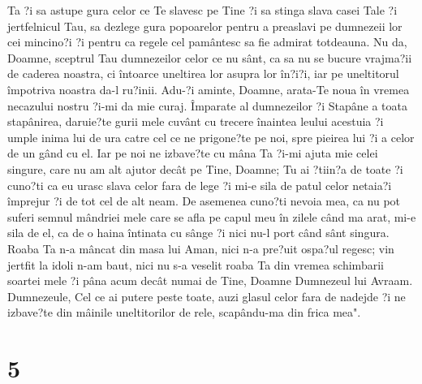 Ta ?i sa astupe gura celor ce Te slavesc pe Tine ?i sa stinga slava casei Tale ?i jertfelnicul Tau, sa dezlege gura popoarelor pentru a preaslavi pe dumnezeii lor cei mincino?i ?i pentru ca regele cel pamântesc sa fie admirat totdeauna. Nu da, Doamne, sceptrul Tau dumnezeilor celor ce nu sânt, ca sa nu se bucure vrajma?ii de caderea noastra, ci întoarce uneltirea lor asupra lor în?i?i, iar pe uneltitorul împotriva noastra da-l ru?inii. Adu-?i aminte, Doamne, arata-Te noua în vremea necazului nostru ?i-mi da mie curaj. Împarate al dumnezeilor ?i Stapâne a toata stapânirea, daruie?te gurii mele cuvânt cu trecere înaintea leului acestuia ?i umple inima lui de ura catre cel ce ne prigone?te pe noi, spre pieirea lui ?i a celor de un gând cu el. Iar pe noi ne izbave?te cu mâna Ta ?i-mi ajuta mie celei singure, care nu am alt ajutor decât pe Tine, Doamne; Tu ai ?tiin?a de toate ?i cuno?ti ca eu urasc slava celor fara de lege ?i mi-e sila de patul celor netaia?i împrejur ?i de tot cel de alt neam. De asemenea cuno?ti nevoia mea, ca nu pot suferi semnul mândriei mele care se afla pe capul meu în zilele când ma arat, mi-e sila de el, ca de o haina întinata cu sânge ?i nici nu-l port când sânt singura. Roaba Ta n-a mâncat din masa lui Aman, nici n-a pre?uit ospa?ul regesc; vin jertfit la idoli n-am baut, nici nu s-a veselit roaba Ta din vremea schimbarii soartei mele ?i pâna acum decât numai de Tine, Doamne Dumnezeul lui Avraam. Dumnezeule, Cel ce ai putere peste toate, auzi glasul celor fara de nadejde ?i ne izbave?te din mâinile uneltitorilor de rele, scapându-ma din frica mea".

\chapter{5}

